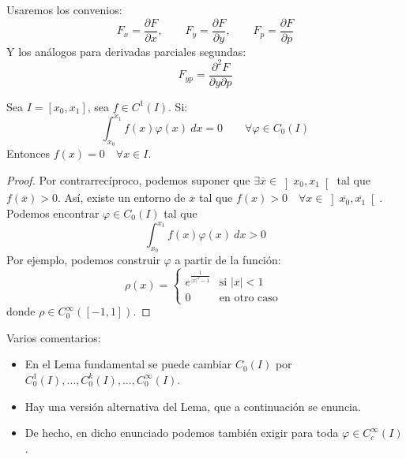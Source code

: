 \begin{notacion}
    Usaremos los convenios:
    \begin{equation*}
        F_x = \frac{\partial F}{\partial x}, \qquad F_y = \frac{\partial F}{\partial y}, \qquad F_p = \frac{\partial F}{\partial p}
    \end{equation*}
    Y los análogos para derivadas parciales segundas:
    \begin{equation*}
        F_{yp} = \frac{\partial^2 F}{\partial y\partial p}
    \end{equation*}
\end{notacion}

\begin{lema}
    Sea $I = [x_0,x_1]$, sea $f\in C^1(I)$. Si:
    \begin{equation*}
        \int_{x_0}^{x_1} f(x)\varphi(x)~dx = 0  \qquad \forall \varphi \in C_0(I)
    \end{equation*}
    Entonces $f(x) = 0 \quad \forall x\in I$.
    \begin{proof}
        Por contrarrecíproco, podemos suponer que $\exists \overline{x}\in \left]x_0,x_1\right[$ tal que $f(\overline{x})>0$. Así, existe un entorno de $\overline{x}$ tal que $f(x) > 0 \quad \forall x\in \left]\overline{x_0},\overline{x_1}\right[$. Podemos encontrar $\varphi \in C_0(I)$ tal que
        \begin{equation*}
            \int_{x_0}^{x_1} f(x)\varphi(x)~dx  > 0
        \end{equation*}
        Por ejemplo, podemos construir $\varphi$ a partir de la función:
        \begin{equation*}
            \rho(x) = \left\{\begin{array}{ll}
                e^{\frac{1}{|x|^2-1}} & \text{si\ } |x| < 1 \\
                 0 & \text{en otro caso\ } 
            \end{array}\right. 
        \end{equation*}
        donde $\rho \in C_0^\infty([-1,1])$.
    \end{proof}
\end{lema}

\begin{observacion}
    Varios comentarios:
    \begin{itemize}
        \item En el Lema fundamental se puede cambiar $C_0(I)$ por $C_0^1(I), \ldots, C_0^k(I), \ldots, C_0^\infty(I)$.
        \item Hay una versión alternativa del Lema, que a continuación se enuncia.
        \item De hecho, en dicho enunciado podemos también exigir para toda $\varphi \in C_c^\infty(I)$.
    \end{itemize}
\end{observacion}

